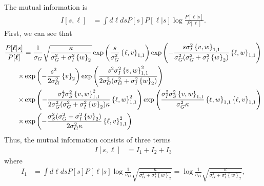 \documentclass[11pt]{article}
\begin{document}
The mutual information is 
\begin{align}
	I[s,\boldsymbol{\ell}] &= \int d\boldsymbol{\ell} ds P[s] P[\boldsymbol{\ell}|s] \log \frac{P[\boldsymbol{\ell}|s]}{P[\boldsymbol{\ell}]}.
\end{align}
First, we can see that 
\begin{align}
 \frac{P[\boldsymbol{\ell}|s]}{P[\boldsymbol{\ell}]} &= \frac{1}{\sigma_G} \sqrt{\frac{\kappa}{\sigma_G^2 + \sigma_I^2 \left\{w\right\}_2}}\exp\left(\frac{s}{\sigma_G^2} \left\{\ell, v\right\}_{1,1}\right) \exp\left(- \frac{s \sigma_I^2 \left\{v,w\right\}_{1,1}}{ \sigma_G^2 (\sigma_G^2 + \sigma_I^2 \left\{w\right\}_2)} \left\{\ell, w\right\}_{1,1}\right) \notag \\
 \times &\exp\left(-\frac{s^2}{2\sigma_G^2} \left\{v\right\}_2\right) \exp\left(\frac{s^2 \sigma_I^2 \left\{v,w\right\}_{1,1}^2}{2 \sigma_G^2 (\sigma_G^2 + \sigma_I^2 \left\{w\right\}_2)}\right) \notag \\
 \times & \exp\left( -\frac{\sigma_I^4 \sigma_S^2 \left\{v,w\right\}_{1,1}^2}{2 \sigma_G^2(\sigma_G^2 + \sigma_I^2 \left\{w\right\}_2) \kappa} \left\{\ell, w\right\}_{1,1}^2\right)\exp\left(\frac{\sigma_I^2 \sigma_S^2\left\{v,w\right\}_{1,1}}{\sigma_G^2\kappa} \left\{\ell, w\right\}_{1,1} \left\{\ell, v\right\}_{1,1} \right)  \notag \\
 \times & \exp\left(-\frac{\sigma_S^2 (\sigma_G^2 + \sigma_I^2 \left\{w\right\}_2)}{2 \sigma_G^2 \kappa} \left\{\ell, v\right\}_{1,1}^2\right)
\end{align}
Thus, the mutual information consists of three terms
\begin{align}
	I[s, \boldsymbol{\ell}] &= I_1 + I_2 + I_3
\end{align}
where
\begin{align}
	I_1 &= \int d\boldsymbol{\ell} ds P[s] P[\boldsymbol{\ell}|s] \log \frac{1}{\sigma_G} \sqrt{\frac{\kappa}{\sigma_G^2 + \sigma_I^2 \left\{w\right\}_2}} = \log \frac{1}{\sigma_G} \sqrt{\frac{\kappa}{\sigma_G^2 + \sigma_I^2 \left\{w\right\}_2}},
\end{align}
\end{document}
